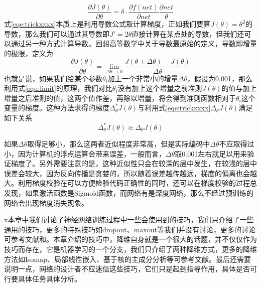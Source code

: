 \begin{equation}
\frac{\partial J(\theta)}{\partial \theta} = \delta \cdot \frac{\partial f(net)}{\partial net} \frac{\partial net}{\theta}
\label{eqe:trickxxxx}
\end{equation}
式\eqref{eqe:trickxxxx}本质上是利用导数公式取计算梯度，正如我们要算$J(\theta) = \theta ^2$的导数，那么我们可以通过其导数即$J'= 2 \theta$直接计算在某点处的导数，但我们还可以通过另一种方式计算导数。回想高等数学中关于导数最原始的定义，导数即增量的极限，定义为
\begin{equation}
\frac{\partial J(\theta)}{\partial \theta} = \lim\limits_{\Delta\theta \rightarrow 0} \frac{J(\theta + \Delta\theta) - J(\theta)}{\Delta\theta}
\label{equ:limit}
\end{equation}
也就是说，如果我们给某个参数$\theta_i$加上一个非常小的增量$\Delta\theta$，假设为0.001，那么利用式\eqref{equ:limit}的原理，我们对比$\theta_i$没有加上这个增量之前准则$J(\theta)$的值与加上增量之后准则的值，这两个值作差，再除以增量，将会得到准则函数相对于$\theta_i$这个变量的梯度。这种方法求得的梯度$\Delta^*_\theta J(\theta)$与利用式\eqref{eqe:trickxxxx}$\Delta_\theta J(\theta)$满足如下关系
\begin{equation}
\Delta^*_\theta J(\theta) \approx \Delta_\theta J(\theta)
\end{equation}

如果$\Delta\theta$取得足够小，那么这两者近似程度非常高，但是实际编码中$\Delta\theta$不应取得过小，因为计算机的浮点运算会带来误差，一般而言，$\Delta\theta$取0.001左右就足以用来验证梯度了。另外需要注意的是，这种近似性只会在较深的层中发生，在较浅的层中误差会较大，因为反向传播是贪婪的，所以随着误差越传越远，梯度的偏离也会越大。利用梯度校验在可以方便检验代码正确性的同时，还可以在梯度校验的过程总发现，如果激活函数是Sigmoid函数，而网络有是深度网络，那么不经过预训练的网络会出现梯度消失现象。

x本章中我们讨论了神经网络训练过程中一些会使用到的技巧，我们只介绍了一些通用的技巧，更多的特殊技巧如dropout、maxout等我们并没有讨论，更多的讨论可参考文献\cite{baldi2013understanding}和\cite{goodfellow2013maxout}。本章介绍的技巧中，降维自身就是一个很大的话题，并不仅仅作为技巧而存在，它是机器学习的一个分支，我们只介绍了两种降维方式，更多的降维方法如Isomap、局部线性嵌入、基于核的主成分分析等可参考文献\cite{tenenbaum2000global,roweis2000nonlinear,scholkopf1998kernel}。最后还需要说明一点，网络的设计者不应迷信这些技巧，它们只是起到指导作用，具体是否可行要具体任务具体分析。

